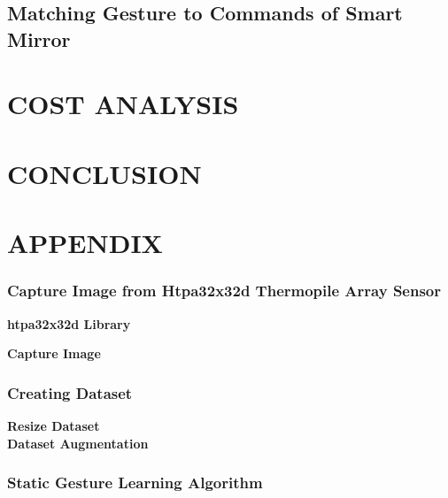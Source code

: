 \documentclass[thesis]{deutez}
\begin{document}
\section{Matching Gesture to Commands of Smart Mirror}
\chapter{COST ANALYSIS}
\chapter{CONCLUSION}
\chapter{APPENDIX}
\subsection{Capture Image from Htpa32x32d Thermopile Array Sensor}
\textbf{htpa32x32d Library}

\textbf{Capture Image}

\subsection{Creating Dataset }
\textbf{Resize Dataset}\\

\textbf{Dataset Augmentation}\\

\subsection{Static Gesture Learning Algorithm}


\end{document}

